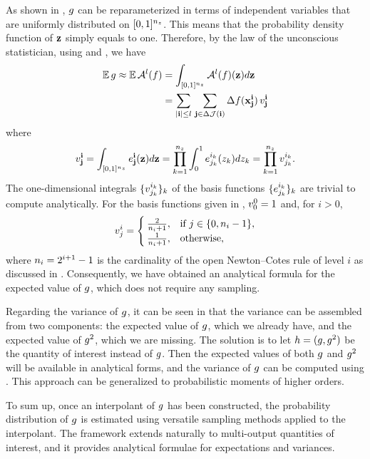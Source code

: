 As shown in , $g$ can be reparameterized in terms of
independent variables that are uniformly distributed on $[0, 1]^{n_z}$. This means
that the probability density function of $\mathbf{z}$ simply equals to one. Therefore,
by the law of the unconscious statistician, using  and
, we have
\begin{align*}
  \mathbb{E} \, g \approx \mathbb{E} \, \mathcal{A}^{l}(f) &= \int_{[0, 1]^{n_z}} \mathcal{A}^{l}(f)(\mathbf{z}) d\mathbf{z} \\
  &= \sum_{|\mathbf{i}| \leq l} \, \sum_{\mathbf{j} \in \Delta\mathcal{J}(\mathbf{i})} \Delta f(\mathbf{x}^{\mathbf{i}}_{\mathbf{j}}) \, v^{\mathbf{i}}_{\mathbf{j}}
\end{align*}
where
\[
  v^{\mathbf{i}}_{\mathbf{j}} = \int_{[0, 1]^{n_z}} e^{\mathbf{i}}_{\mathbf{j}}(\mathbf{z}) d\mathbf{z} = \prod_{k = 1}^{{n_z}} \int_0^1 e^{i_k}_{j_k}(z_k) dz_k = \prod_{k = 1}^{{n_z}} v^{i_k}_{j_k}.
\]
The one-dimensional integrals $\{ v^{i_k}_{j_k} \}_k$ of the basis functions
$\{ e^{i_k}_{j_k} \}_k$ are trivial to compute analytically. For the basis
functions given in , $v^0_0 = 1$ and, for $i > 0$,
\[
  v^i_j = \begin{cases}
    \frac{2}{n_i + 1}, & \text{if } j \in \{ 0, n_i - 1 \}, \\
    \frac{1}{n_i + 1}, & \text{otherwise},
  \end{cases}
\]
where $n_i = 2^{i + 1} - 1$ is the cardinality of the open Newton--Cotes rule
of level $i$ as discussed in . Consequently, we have
obtained an analytical formula for the expected value of $g$, which does not
require any sampling.

Regarding the variance of $g$, it can be seen in  that the
variance can be assembled from two components: the expected value of $g$, which
we already have, and the expected value of $g^2$, which we are missing. The
solution is to let $h = (g, g^2)$ be the quantity of interest instead of $g$.
Then the expected values of both $g$ and $g^2$ will be available in analytical
forms, and the variance of $g$ can be computed using . This
approach can be generalized to probabilistic moments of higher orders.

To sum up, once an interpolant of $g$ has been constructed, the probability
distribution of $g$ is estimated using versatile sampling methods applied to
the interpolant. The framework extends naturally to multi-output quantities of
interest, and it provides analytical formulae for expectations and variances.

